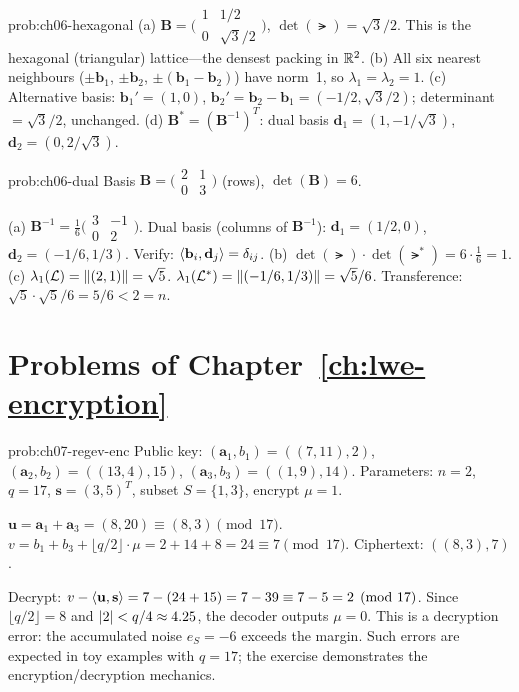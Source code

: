 \begin{sol}{prob:ch06-hexagonal}
(a) $\mathbf{B}=\bigl(\begin{smallmatrix}1&1/2\\0&\sqrt{3}/2\end{smallmatrix}\bigr)$, $\det(\lat)=\sqrt{3}/2$.  This is the hexagonal (triangular) lattice---the densest packing in $\mathbb{R}^2$.
(b) All six nearest neighbours ($\pm\mathbf{b}_1$, $\pm\mathbf{b}_2$, $\pm(\mathbf{b}_1-\mathbf{b}_2)$) have norm~1, so $\lambda_1=\lambda_2=1$.
(c) Alternative basis: $\mathbf{b}_1'=(1,0)$, $\mathbf{b}_2'=\mathbf{b}_2-\mathbf{b}_1=(-1/2,\sqrt{3}/2)$; determinant $=\sqrt{3}/2$, unchanged.\;\checkmark
(d) $\mathbf{B}^*=(\mathbf{B}^{-1})^T$: dual basis $\mathbf{d}_1=(1,-1/\sqrt{3})$, $\mathbf{d}_2=(0,2/\sqrt{3})$.
\end{sol}

\begin{sol}{prob:ch06-dual}
Basis $\mathbf{B}=\bigl(\begin{smallmatrix}2&1\\0&3\end{smallmatrix}\bigr)$ (rows), $\det(\mathbf{B})=6$.

(a) $\mathbf{B}^{-1}=\frac{1}{6}\bigl(\begin{smallmatrix}3&-1\\0&2\end{smallmatrix}\bigr)$.
Dual basis (columns of $\mathbf{B}^{-1}$): $\mathbf{d}_1=(1/2,0)$, $\mathbf{d}_2=(-1/6,1/3)$.
Verify: $\left\langle \mathbf{b}_i, \mathbf{d}_j \right\rangle=\delta_{ij}$\;\checkmark.
(b) $\det(\lat)\cdot\det(\lat^*)=6\cdot\frac{1}{6}=1$.\;\checkmark
(c) $\lambda_1(\mathcal{L})=\left\lVert (2,1) \right\rVert=\sqrt{5}$.  $\lambda_1(\mathcal{L}^*)=\left\lVert (-1/6,1/3) \right\rVert=\sqrt{5}/6$.
Transference: $\sqrt{5}\cdot\sqrt{5}/6 = 5/6 < 2 = n$.\;\checkmark
\end{sol}

\section*{Problems of Chapter~\ref{ch:lwe-encryption}}

\begin{sol}{prob:ch07-regev-enc}
Public key: $(\mathbf{a}_1,b_1)=((7,11),2)$, $(\mathbf{a}_2,b_2)=((13,4),15)$, $(\mathbf{a}_3,b_3)=((1,9),14)$.
Parameters: $n=2$, $q=17$, $\mathbf{s}=(3,5)^T$, subset $S=\{1,3\}$, encrypt $\mu=1$.

$\mathbf{u}=\mathbf{a}_1+\mathbf{a}_3=(8,20)\equiv(8,3)\pmod{17}$.
$v = b_1+b_3+\lfloor q/2\rfloor\cdot\mu = 2+14+8 = 24\equiv 7\pmod{17}$.
Ciphertext: $((8,3),7)$.

Decrypt: $v-\left\langle \mathbf{u}, \mathbf{s} \right\rangle = 7-(24+15)=7-39\equiv 7-5=2\pmod{17}$.
Since $\lfloor q/2\rfloor=8$ and $\left\lvert 2 \right\rvert<q/4\approx 4.25$, the decoder outputs $\mu=0$.
This is a decryption error: the accumulated noise $e_S=-6$ exceeds the margin.
Such errors are expected in toy examples with $q=17$; the exercise demonstrates the encryption/decryption mechanics.
\end{sol}


